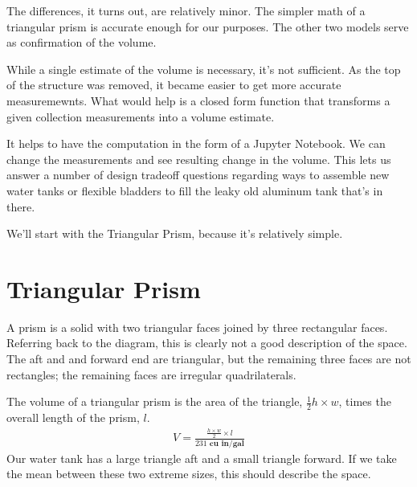 \documentclass[letterpaper,10pt,english]{sphinxmanual}
\begin{document}
\sphinxAtStartPar
The differences, it turns out, are relatively minor. The simpler math of a triangular prism
is accurate enough for our purposes. The other two models serve as confirmation of the volume.

\sphinxAtStartPar
While a single estimate of the volume is necessary, it’s not sufficient.
As the top of the structure was removed, it became easier to get more accurate measuremewnts.
What would help is a closed form function that transforms a given collection measurements
into a volume estimate.

\sphinxAtStartPar
It helps to have the computation in the form of a Jupyter Notebook.
We can change the measurements and see resulting change in the volume.
This lets us answer a number of design tradeoff questions regarding ways
to assemble new water tanks or flexible bladders to fill the leaky old aluminum tank that’s in there.

\sphinxAtStartPar
We’ll start with the Triangular Prism, because it’s relatively simple.


\section{Triangular Prism}
\label{\detokenize{prism:triangular-prism}}\label{\detokenize{prism::doc}}
\sphinxAtStartPar
A prism is a solid with two triangular faces joined by three rectangular faces. Referring back to the diagram, this is clearly not a good description of the space. The aft and and forward end are triangular, but the remaining three faces are not rectangles; the remaining faces are irregular quadrilaterals.

\sphinxAtStartPar
The volume of a triangular prism is the area of the triangle, \(\frac{1}{2} h \times w\), times the overall length of the prism, \(l\).
\begin{equation*}
\begin{split}
V = \frac{\frac{h \times w}{2} \times l}{231 \textbf{ cu in/gal}}
\end{split}
\end{equation*}
\sphinxAtStartPar
Our water tank has a large triangle aft and a small triangle forward. If we take the mean between these two extreme sizes, this should describe the space.

\begin{sphinxVerbatim}[commandchars=\\\{\}]
   
\end{sphinxVerbatim}
\end{document}
